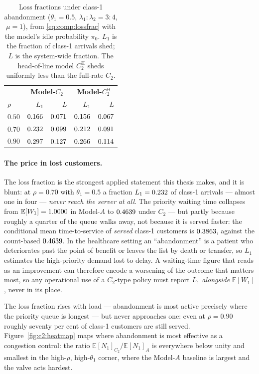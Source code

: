 \documentclass{article}
\numberwithin{equation}{section}
\newcommand{\CH}{C_2^{\mathrm{H}}}
\begin{document}
\begin{table}[H]
\centering
\caption{Loss fractions under class-1 abandonment ($\theta_1=0.5$, $\lambda_1{:}\lambda_2=3{:}4$,
$\mu=1$), from \eqref{eq:comp:lossfrac} with the model's idle probability $\pi_0$. $L_1$ is the
fraction of class-1 arrivals shed; $L$ is the system-wide fraction. The head-of-line model
$\CH$ sheds uniformly less than the full-rate $C_2$.}
\label{tab:comp:loss}
\begin{tabular}{lrrrr}
\hline
 & \multicolumn{2}{c}{\textbf{Model-$C_2$}} & \multicolumn{2}{c}{\textbf{Model-$\CH$}} \\
$\rho$ & $L_1$ & $L$ & $L_1$ & $L$ \\
\hline
$0.50$ & $0.166$ & $0.071$ & $0.156$ & $0.067$ \\
$0.70$ & $0.232$ & $0.099$ & $0.212$ & $0.091$ \\
$0.90$ & $0.297$ & $0.127$ & $0.266$ & $0.114$ \\
\hline
\end{tabular}
\end{table}

\paragraph{The price in lost customers.}\label{subsubsec:comp:loss_price}
The loss fraction is the strongest applied statement this thesis makes, and it is blunt: at
$\rho=0.70$ with $\theta_1=0.5$ a fraction $L_1=0.232$ of class-1 arrivals ---
almost one in four --- \emph{never reach the server at all}. The priority waiting time collapses
from $\mathbb{E}[W_1]=1.0000$ in Model-$A$ to $0.4639$ under $C_2$ --- but partly
because roughly a quarter of the queue walks away, not because it is served faster: the
conditional mean time-to-service of \emph{served} class-1 customers is $0.3863$, against
the count-based $0.4639$. In the healthcare setting an ``abandonment'' is a patient who
deteriorates past the point of benefit or leaves the list by death or transfer, so $L_1$
estimates the high-priority demand lost to delay. A waiting-time figure that reads as an
improvement can therefore encode a worsening of the outcome that matters most, so any
operational use of a $C_2$-type policy must report $L_1$ \emph{alongside} $\mathbb{E}[W_1]$,
never in its place.

The loss fraction rises with load --- abandonment is most active precisely where the priority
queue is longest --- but never approaches one: even at $\rho=0.90$ roughly seventy per cent of
class-1 customers are still served. Figure~\ref{fig:c2:heatmap} maps where abandonment is most effective as a congestion control:
the ratio $\mathbb{E}[N_1]_{C_2}/\mathbb{E}[N_1]_A$ is
everywhere below unity and smallest in the high-$\rho$, high-$\theta_1$ corner, where the
Model-$A$ baseline is largest and the valve acts hardest.
\end{document}
